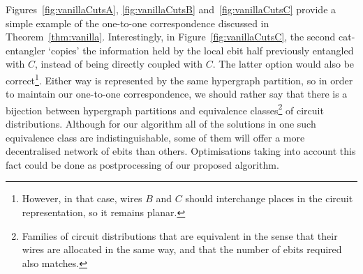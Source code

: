 \begin{comment}
\begin{algorithm}[caption={Builds the distributed circuit determined by the input hypergraph partition. The hypergraph partition is provided as an assignment \(qpuOf \colon \mathbb{N} \to \mathbb{N}\) which indicates the QPU number of the given wire},label={code:distributeVanilla}]
input: circuit, $qpuOf$
output: distributed
begin
  distributed $\gets$ $emptyCircuit$
  foreach wire in circuit do
    thisQPU = $qpuOf$(wire)
    activeConnections $\gets$ $\varnothing$
    foreach gate in wire do
      if gate == CNOT and $controlOf$(gate) == wire then
        targetQPU = $qpuOf$($targetOf$(gate))
        if targetQPU == thisQPU then
          distributed.$addCNOTAt$(wire,target)
        else
          ebit $\gets$ activeConnections.$at$(targetQPU)
          if ebit == null then
            ebit $\gets$ $distillEbit$(thisQPU, targetQPU)
            distributed.$addCatEntangler$(ebit, wire)
            activeConnections.$at$(targetQPU) $\gets$ ebit
          distributed.$addCNOTAt$(ebit,$targetOf$(gate))
      else
        distributed.$addGateAt$(gate,wire)
end
\end{algorithm}
\end{comment}


\begin{remark} \normalfont
Figures~\ref{fig:vanillaCutsA}, \ref{fig:vanillaCutsB} and~\ref{fig:vanillaCutsC} provide a simple example of the one-to-one correspondence discussed in Theorem~\ref{thm:vanilla}. Interestingly, in Figure~\ref{fig:vanillaCutsC}, the second cat-entangler `copies' the information held by the local ebit half previously entangled with \(C\), instead of being directly coupled with \(C\). The latter option would also be correct\footnote{However, in that case, wires \(B\) and \(C\) should interchange places in the circuit representation, so it remains planar.}. Either way is represented by the same hypergraph partition, so in order to maintain our one-to-one correspondence, we should rather say that there is a bijection between hypergraph partitions and equivalence classes\footnote{Families of circuit distributions that are equivalent in the sense that their wires are allocated in the same way, and that the number of ebits required also matches.} of circuit distributions. Although for our algorithm all of the solutions in one such equivalence class are indistinguishable, some of them will offer a more decentralised network of ebits than others. Optimisations taking into account this fact could be done as postprocessing of our proposed algorithm.
\end{remark}


